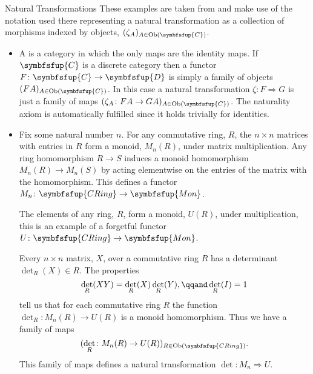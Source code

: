 \documentclass[fleqn]{NotesClass}
\makeatletter
\newcommand{\cat}[1]{\symbfsfup{#1}}
\newcommand{\c@egory}[1]{\symbfsfup{#1}}
\newcommand{\Mon}{\c@egory{Mon}}
\newcommand{\CRing}{\c@egory{CRing}}
\DeclareMathOperator{\Ob}{Ob}
\newcommand{\naturalTransformation}{\Rightarrow}
\DeclareMathOperator{\det}{det}
\makeatother
\begin{document}
    \begin{exm}{Natural Transformations}{}
        These examples are taken from \cite{leinster} and make use of the notation used there representing a natural transformation as a collection of morphisms indexed by objects, \((\zeta_A)_{A \in \Ob(\cat{C})}\).
        \begin{itemize}
            \item A  is a category in which the only maps are the identity maps.
            If \(\cat{C}\) is a discrete category then a functor \(F \colon \cat{C} \to \cat{D}\) is simply a family of objects \((FA)_{A \in \Ob(\cat{C})}\).
            In this case a natural transformation \(\zeta \colon F \naturalTransformation G\) is just a family of maps \((\zeta_A \colon FA \to GA)_{A \in \Ob(\cat{C})}\).
            The naturality axiom is automatically fulfilled since it holds trivially for identities.
            \item Fix some natural number \(n\).
            For any commutative ring, \(R\), the \(n \times n\) matrices with entries in \(R\) form a monoid, \(M_n(R)\), under matrix multiplication.
            Any ring homomorphism \(R \to S\) induces a monoid homomorphism \(M_n(R) \to M_n(S)\) by acting elementwise on the entries of the matrix with the homomorphism.
            This defines a functor \(M_n \colon \CRing \to \Mon\).
            
            The elements of any ring, \(R\), form a monoid, \(U(R)\), under multiplication, this is an example of a forgetful functor \(U \colon \CRing \to \Mon\).
            
            Every \(n \times n\) matrix, \(X\), over a commutative ring \(R\) has a determinant \(\det_R(X) \in R\).
            The properties
            \begin{equation}
                \det_R(XY) = \det_R(X)\det_R(Y), \qqand \det_R(I) = 1
            \end{equation}
            tell us that for each commutative ring \(R\) the function \(\det_R \colon M_n(R) \to U(R)\) is a monoid homomorphism.
            Thus we have a family of maps
            \begin{equation}
                (\det_R \colon M_n(R) \to U(R))_{R \in \Ob(\CRing)}.
            \end{equation}
            This family of maps defines a natural transformation \(\det \colon M_n \naturalTransformation U\).
            

\end{itemize}
\end{exm}
\end{document}
